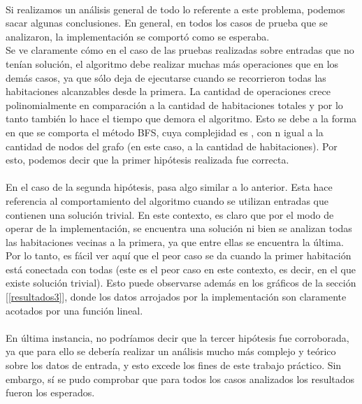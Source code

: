 \paragraph{}
Si realizamos un análisis general de todo lo referente a este problema, podemos sacar algunas conclusiones. En general, en todos los casos de prueba que se analizaron, la implementación se comportó como se esperaba.\\
Se ve claramente cómo en el caso de las pruebas realizadas sobre entradas que no tenían solución, el algoritmo debe realizar muchas más operaciones que en los demás casos, ya que sólo deja de ejecutarse cuando se recorrieron todas las habitaciones alcanzables desde la primera. La cantidad de operaciones crece polinomialmente en comparación a la cantidad de habitaciones totales y por lo tanto también lo hace el tiempo que demora el algoritmo. Esto se debe a la forma en que se comporta el método BFS, cuya complejidad es , con n igual a la cantidad de nodos del grafo (en este caso, a la cantidad de habitaciones). Por esto, podemos decir que la primer hipótesis realizada fue correcta.

\paragraph{}
En el caso de la segunda hipótesis, pasa algo similar a lo anterior. Esta hace referencia al comportamiento del algoritmo cuando se utilizan entradas que contienen una solución trivial. En este contexto, es claro que por el modo de operar de la implementación, se encuentra una solución ni bien se analizan todas las habitaciones vecinas a la primera, ya que entre ellas se encuentra la última. Por lo tanto, es fácil ver aquí que el peor caso se da cuando la primer habitación está conectada con todas (este es el peor caso en este contexto, es decir, en el que existe solución trivial). Esto puede observarse además en los gráficos de la sección [\ref{resultados3}], donde los datos arrojados por la implementación son claramente acotados por una función lineal.

\paragraph{}
En última instancia, no podríamos decir que la tercer hipótesis fue corroborada, ya que para ello se debería realizar un análisis mucho más complejo y teórico sobre los datos de entrada, y esto excede los fines de este trabajo práctico. Sin embargo, sí se pudo comprobar que para todos los casos analizados los resultados fueron los esperados.